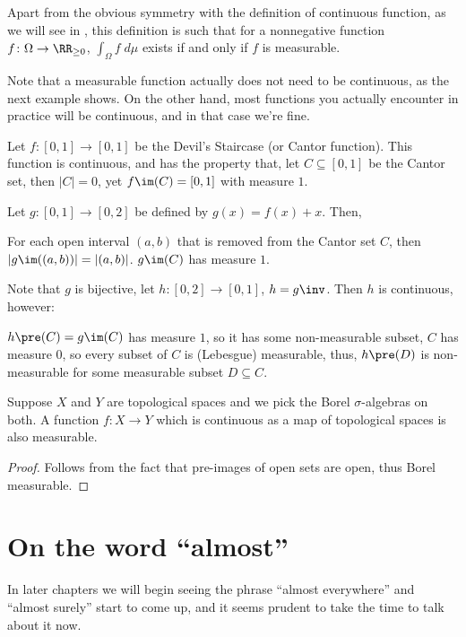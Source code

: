 Apart from the obvious symmetry with the definition of continuous function,
as we will see in , this definition is such that
for a nonnegative function $f \colon \Omega \to \RR_{\geq 0}$,
$\int_\Omega f \; d\mu$ exists if and only if $f$ is measurable.

\begin{remark}
	Note that a measurable function actually does not need to be continuous,
	as the next example shows.
	On the other hand, most functions you actually encounter in practice will be continuous,
	and in that case we're fine.
\end{remark}
\begin{example}
	Let $f \colon [0, 1] \to [0, 1]$ be the Devil's Staircase (or Cantor function).
	This function is continuous, and has the property that, let $C \subseteq [0, 1]$ be the Cantor set,
	then $|C| = 0$, yet $f\im(C) = [0, 1]$ with measure $1$.

	Let $g \colon [0, 1] \to [0, 2]$ be defined by $g(x) = f(x) + x$. Then,
	\begin{itemize}
		\ii For each open interval $(a, b)$ that is removed from the Cantor set $C$, then $|g\im((a,
		b))| = |(a, b)|$.
		\ii $g\im(C)$ has measure $1$.
	\end{itemize}

	Note that $g$ is bijective, let $h \colon [0, 2] \to [0, 1]$, $h = g\inv$. Then $h$ is continuous,
	however:
	\begin{itemize}
		\ii $h\pre(C) = g\im(C)$ has measure $1$, so it has some non-measurable subset,
		\ii $C$ has measure $0$, so every subset of $C$ is (Lebesgue) measurable,
		\ii thus, $h\pre(D)$ is non-measurable for some measurable subset $D \subseteq C$.
	\end{itemize}
\end{example}

\begin{proposition}
	Suppose $X$ and $Y$ are topological spaces
	and we pick the Borel $\sigma$-algebras on both.
	A function $f \colon X \to Y$
	which is continuous as a map of topological spaces is also measurable.
\end{proposition}
\begin{proof}
	Follows from the fact that pre-images of open sets are open, thus Borel measurable.
\end{proof}

\section{On the word ``almost''}
In later chapters we will begin seeing the phrase ``almost everywhere''
and ``almost surely'' start to come up,
and it seems prudent to take the time to talk about it now.

